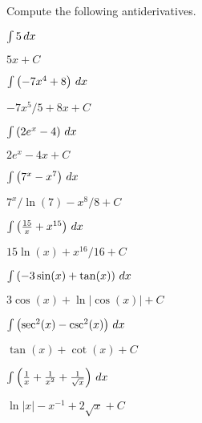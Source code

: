 \begin{exercises}
\noindent Compute the following antiderivatives.
\begin{multicols}{2}
\begin{exercise}
$\int 5\, d x$
\begin{answer}
$5x+C$
\end{answer}
\end{exercise}

\begin{exercise}
$\int \left(-7x^4+8\right)\, d x$
\begin{answer}
$-7x^5/5 +8x + C$
\end{answer}
\end{exercise}

\begin{exercise}
$\int \left(2e^x -4\right)\, d x$
\begin{answer}
$2e^x -4x + C$
\end{answer}
\end{exercise}

\begin{exercise}
$\int \left(7^x - x^7\right)\, d x$
\begin{answer}
$7^x/\ln(7) - x^8/8 +C$
\end{answer}
\end{exercise}


\begin{exercise}
$\int \left(\frac{15}{x}+x^{15}\right)\, d x$
\begin{answer}
$15\ln(x) + x^{16}/16 + C$
\end{answer}
\end{exercise}


\begin{exercise}
$\int \left(-3\sin(x) + \tan(x)\right)\, d x$
\begin{answer}
$3\cos(x) +\ln|\cos(x)|+C$
\end{answer}
\end{exercise}

\begin{exercise}
$\int \left(\sec^2(x) -\csc^2(x)\right) \, d x$
\begin{answer}
$\tan(x) + \cot(x) + C$
\end{answer}
\end{exercise}


\begin{exercise}
$\int\left(\frac{1}{x} + \frac{1}{x^2} + \frac{1}{\sqrt{x}}\right)\, d x$
\begin{answer}
$\ln|x|  - x^{-1} + 2\sqrt{x} +C$ 
\end{answer}
\end{exercise}


\end{multicols}
\end{exercises}
